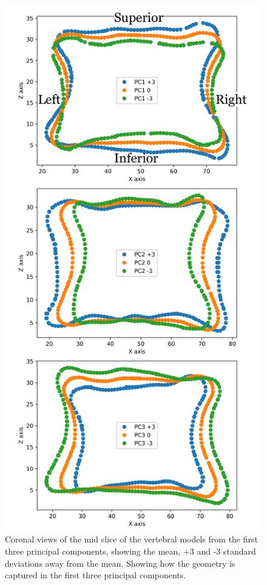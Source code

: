 \begin{figure}[p]
  \centering
  \includegraphics[width=.65\textwidth]{Chapters/Chapter_PCA_images/PC1_2_3_CoronalSlice.pdf}
  \caption{Coronal views of the mid slice of the vertebral models from the first three principal components, showing the mean, +3 and -3 standard deviations away from the mean. Showing how the geometry is captured in the first three principal components.}
  \label{fig:PC1_2_3_CoronalSlice}
\end{figure}

